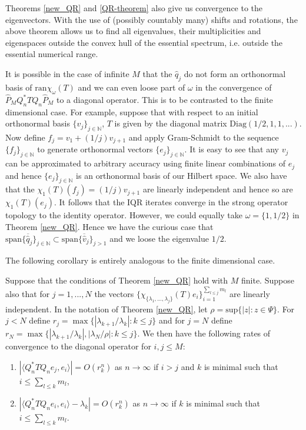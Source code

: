 \documentclass[a4paper,10pt]{article}
\begin{document}
Theorems \ref{new_QR} and \ref{QR-theorem} also give us convergence to the eigenvectors. With the use of (possibly countably many) shifts and rotations, the above theorem allows us to find all eigenvalues, their multiplicities and eigenspaces outside the convex hull of the essential spectrum, i.e. outside the essential numerical range.

\begin{example}
\label{lose_spec_exam}
It is possible in the case of infinite $M$ that the $\hat q_j$ do not form an orthonormal basis of $\mathrm{ran}\chi_{\omega}(T)$ and we can even loose part of $\omega$ in the convergence of $\widehat P_{M} Q_n^*TQ_n \widehat P_{M}$ to a diagonal operator. This is to be contrasted to the finite dimensional case. For example, suppose that with respect to an initial orthonormal basis $\{v_j\}_{j\in\mathbb{N}}$, $T$ is given by the diagonal matrix $\mathrm{Diag}(1/2,1,1,...)$. Now define $f_j=v_1+(1/j)v_{j+1}$ and apply Gram-Schmidt to the sequence $\{f_j\}_{j\in\mathbb{N}}$ to generate orthonormal vectors $\{e_j\}_{j\in\mathbb{N}}$. It is easy to see that any $v_j$ can be approximated to arbitrary accuracy using finite linear combinations of $e_j$ and hence $\{e_j\}_{j\in\mathbb{N}}$ is an orthonormal basis of our Hilbert space. We also have that the $\chi_{1}(T)(f_j)=(1/j)v_{j+1}$ are linearly independent and hence so are $\chi_{1}(T)(e_j)$. It follows that the IQR iterates converge in the strong operator topology to the identity operator. However, we could equally take $\omega=\{1,1/2\}$ in Theorem \ref{new_QR}. Hence we have the curious case that $\overline{\mathrm{span}\{\hat q_j\}_{j\in\mathbb{N}}}\subset\overline{\mathrm{span}\{\hat v_j\}_{j>1}}$ and we loose the eigenvalue $1/2$.
\end{example}

The following corollary is entirely analogous to the finite dimensional case.

\begin{corollary}
\label{new_QRCOR}
Suppose that the conditions of Theorem \ref{new_QR} hold with $M$ finite. Suppose also that for $j=1,...,N$ the vectors $\{\chi_{\{\lambda_1,...,\lambda_j\}}(T)e_i\}_{i=1}^{\sum_{l\leq j}m_l}$ are linearly independent. In the notation of Theorem \ref{new_QR}, let $\rho=\mathrm{sup}\{\left|z\right|:z\in\Psi\}$. For $j<N$ define $r_j=\max\{|\lambda_{k+1}/\lambda_k|:k\leq j\}$ and for $j=N$ define $r_N=\max\{|\lambda_{k+1}/\lambda_k|,|\lambda_N/\rho|:k\leq j\}$. We then have the following rates of convergence to the diagonal operator for $i,j\leq M$:
\begin{enumerate}
	\item $\left|\langle Q_n^*TQ_n e_j, e_i\rangle\right|= O(r_k^n)$ as $n\rightarrow\infty$ if $i>j$ and $k$ is minimal such that $i\leq \sum_{l\leq k}m_l$,
	\item $\left|\langle Q_n^*TQ_n e_i, e_i\rangle-\lambda_k\right|= O(r_k^n)$ as $n\rightarrow\infty$ if $k$ is minimal such that $i\leq \sum_{l\leq k}m_l$.
\end{enumerate}
\end{corollary}
\end{document}
